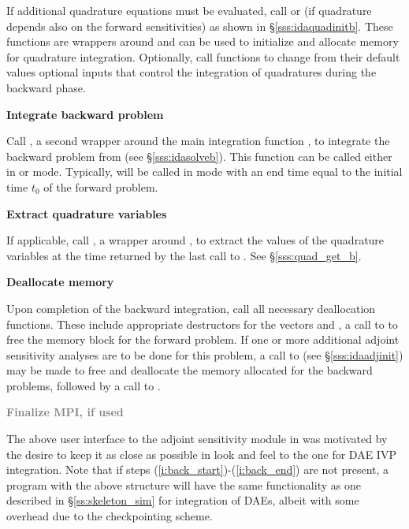 \begin{Steps}
  If additional quadrature equations must be evaluated, 
  call  or  (if quadrature depends also on the
  forward sensitivities) as shown in \S\ref{sss:idaquadinitb}. These functions are
  wrappers around  and can be used to initialize and allocate 
  memory for quadrature integration. Optionally, call  functions 
  to change from their default values optional inputs that control the integration 
  of quadratures during the backward phase.

\item
  {\bf Integrate backward problem}

  Call , a second wrapper around the {\idas} main integration
  function , to integrate the backward problem from 
  (see \S\ref{sss:idasolveb}). This function can be called either in 
  or  mode. Typically,  will be called in 
  mode with an end time equal to the initial time $t_0$ of the forward problem.

\item \label{i:back_end}
  {\bf Extract quadrature variables}

  If applicable, call , a wrapper around ,
  to extract the values of the quadrature variables at the time returned
  by the last call to .  See \S\ref{sss:quad_get_b}.

\item
  {\bf Deallocate memory}

  Upon completion of the backward integration, call all necessary deallocation
  functions. These include appropriate destructors for the vectors  and
  , a call to  to free the {\idas} memory block for the
  forward problem.  If one or more additional adjoint sensitivity analyses are to
  be done for this problem, a call to  (see \S\ref{sss:idaadjinit})
  may be made to free and deallocate the memory allocated for the backward problems,
  followed by a call to .

\item
  \textcolor{gray}{\bf Finalize MPI, if used}

\end{Steps}

The above user interface to the adjoint sensitivity module in {\idas} was motivated by
the desire to keep it as close as possible in look and feel to the one for DAE IVP 
integration. Note that if steps (\ref{i:back_start})-(\ref{i:back_end}) are not present, 
a program with the above structure will have the same functionality as one described in
\S\ref{ss:skeleton_sim} for integration of DAEs, albeit with some overhead due to 
the checkpointing scheme.

